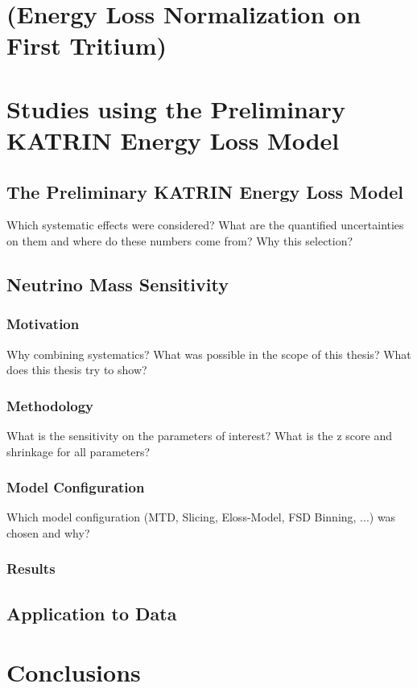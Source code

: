 \documentclass{document/thesisclass}
\begin{document}
    
    
    \chapter{(Energy Loss Normalization on First Tritium)}
    
    
    
    \chapter{Studies using the Preliminary KATRIN Energy Loss Model}
    \section{The Preliminary KATRIN Energy Loss Model}
     Which systematic effects were considered? What are the quantified uncertainties on them and where do these numbers come from? Why this selection?
    \section{Neutrino Mass Sensitivity}
    \subsection{Motivation}
    Why combining systematics? What was possible in the scope of this thesis? What does this thesis try to show?
    \subsection{Methodology}
    What is the sensitivity on the parameters of interest? What is the z score and shrinkage for all parameters?
    \subsection{Model Configuration}
    Which model configuration (MTD, Slicing, Eloss-Model, FSD Binning, ...) was chosen and why?
    \subsection{Results}

    \section{Application to Data}
    
    \chapter{Conclusions}
\end{document}
